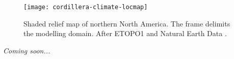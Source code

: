 
\introduction
\label{sec:intro}

\begin{figure}[t]
	\vspace*{2mm}
	\begin{center}
		\texttt{[image: cordillera-climate-locmap]}
	\end{center}
	\caption{Shaded relief map of northern North America. The frame delimits the modelling domain. After ETOPO1 \citep{data:etopo1} and Natural Earth Data \citep{data:naturalearth}.}
	\label{fig:locmap}
\end{figure}

\emph{Coming soon...}

